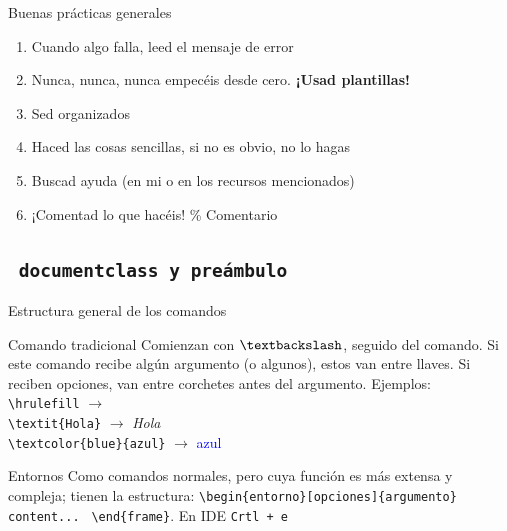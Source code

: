 \documentclass[12pt]{beamer}
\begin{document}
\begin{frame}{Buenas prácticas generales}
\large
	\begin{enumerate}
		\item Cuando algo falla, leed el mensaje de error
		\item Nunca, nunca, nunca empecéis desde cero. \textbf{¡Usad plantillas!}
		\item Sed organizados
		\item Haced las cosas sencillas, si no es obvio, no lo hagas
		\item Buscad ayuda (en mi o en los recursos mencionados)
		\item ¡Comentad lo que hacéis! \% Comentario
	\end{enumerate}
\end{frame}

\subsection{\texttt{\ documentclass y preámbulo}}

\begin{frame}[fragile]{Estructura general de los comandos}
	\begin{block}{Comando tradicional}
		Comienzan con $\textbackslash$, seguido del comando. Si este comando recibe algún argumento (o algunos), estos van entre llaves. Si reciben opciones, van entre corchetes antes del argumento. Ejemplos: \\
		\verb|\hrulefill| $\rightarrow$ \hrulefill \\
		\verb|\textit{Hola}| $\rightarrow$ \textit{Hola} \\
		\verb|\textcolor{blue}{azul}| $\rightarrow$ \textcolor{blue}{azul}
	\end{block} \pause
	\begin{block}{Entornos}
		Como comandos normales, pero cuya función es más extensa y compleja; tienen la estructura: \verb|\begin{entorno}[opciones]{argumento}| \verb| content... | 
	\verb|\end{frame}|. En IDE \texttt{Crtl + e}
	\end{block}
\end{frame}
\end{document}
